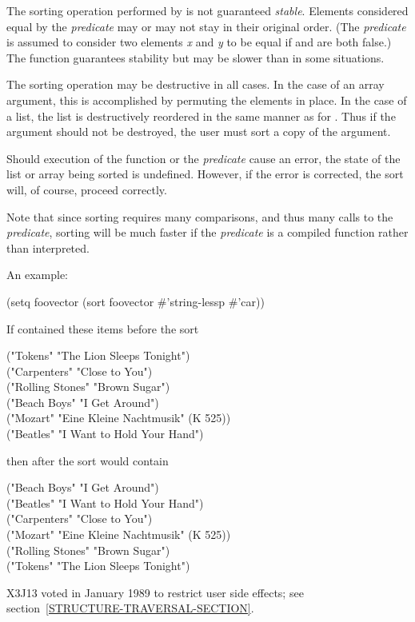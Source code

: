 \begin{defun}[Function]
The sorting operation performed by  is not guaranteed \emph{stable}.
Elements considered equal by the \emph{predicate} may or may not
stay in their original order.  (The \emph{predicate} is assumed to
consider two elements \emph{x} and \emph{y} to be equal if
 and
 are both false.)
The function  guarantees
stability but may be slower than  in some situations.

The sorting operation may be destructive in all cases.  In the case of an
array argument, this is accomplished by permuting the elements in place.
In the case of a list, the list is
destructively reordered in the same manner as for
.  Thus if the argument should not be destroyed, the
user must sort a copy of the argument.

Should execution of the  function or the \emph{predicate} cause an error,
the state of the list or array being sorted is
undefined.  However, if the error is corrected, the sort will, of
course, proceed correctly. 

Note that since sorting requires many comparisons, and thus
many calls to the \emph{predicate}, sorting will be much faster if the
\emph{predicate} is a compiled function rather than interpreted. 

An example:
\begin{lisp}
(setq foovector (sort foovector \#'string-lessp  \#'car))
\end{lisp}
If  contained these items before the sort
\begin{lisp}
("Tokens" "The Lion Sleeps Tonight") \\
("Carpenters" "Close to You") \\
("Rolling Stones" "Brown Sugar") \\
("Beach Boys" "I Get Around") \\
("Mozart" "Eine Kleine Nachtmusik" (K 525)) \\
("Beatles" "I Want to Hold Your Hand")
\end{lisp}
then after the sort  would contain
\begin{lisp}
("Beach Boys" "I Get Around") \\
("Beatles" "I Want to Hold Your Hand") \\
("Carpenters" "Close to You") \\
("Mozart" "Eine Kleine Nachtmusik" (K 525)) \\
("Rolling Stones" "Brown Sugar") \\
("Tokens" "The Lion Sleeps Tonight")
\end{lisp}

\begin{new}
X3J13 voted in January 1989
to restrict user side effects; see section~\ref{STRUCTURE-TRAVERSAL-SECTION}.
\end{new}
\end{defun}

